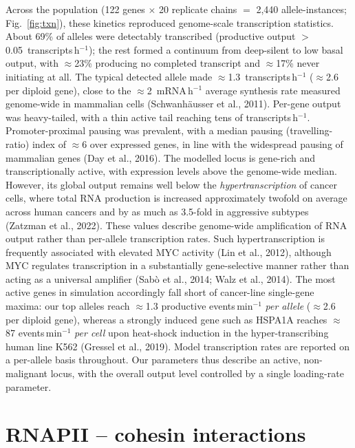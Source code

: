 \documentclass[11pt]{article}
\begin{document}
Across the population (122 genes $\times$ 20 replicate chains $=$ 2{,}440
allele-instances; Fig.~\ref{fig:txn}), these kinetics reproduced genome-scale
transcription statistics. About 69\% of alleles were detectably transcribed (productive
output $>$0.05~transcripts\,h$^{-1}$); the rest formed a continuum from deep-silent to
low basal output, with $\approx$23\% producing no completed transcript and $\approx$17\%
never initiating at all. The typical detected allele made
$\approx$1.3~transcripts\,h$^{-1}$ ($\approx$2.6 per diploid gene), close to the
$\approx$2~mRNA\,h$^{-1}$ average synthesis rate measured genome-wide in mammalian cells
(Schwanh\"ausser et al., 2011). Per-gene output was heavy-tailed, with a thin active
tail reaching tens of transcripts\,h$^{-1}$. Promoter-proximal pausing was prevalent,
with a median pausing (travelling-ratio) index of $\approx$6 over expressed genes, in
line with the widespread pausing of mammalian genes (Day et al., 2016). The modelled
locus is gene-rich and transcriptionally active, with expression levels above the
genome-wide median. However, its global output remains well below the
\emph{hypertranscription} of cancer cells, where total RNA production is increased
approximately twofold on average across human cancers and by as much as 3.5-fold in
aggressive subtypes (Zatzman et al., 2022). These values describe genome-wide
amplification of RNA output rather than per-allele transcription rates. Such
hypertranscription is frequently associated with elevated MYC activity (Lin et al.,
2012), although MYC regulates transcription in a substantially gene-selective manner
rather than acting as a universal amplifier (Sab\`o et al., 2014; Walz et al., 2014).
The most active genes in simulation accordingly fall short of cancer-line single-gene
maxima: our top alleles reach $\approx$1.3 productive events\,min$^{-1}$ \emph{per
allele} ($\approx$2.6 per diploid gene), whereas a strongly induced gene such as HSPA1A
reaches $\approx$87 events\,min$^{-1}$ \emph{per cell} upon heat-shock induction in the
hyper-transcribing human line K562 (Gressel et al., 2019). Model transcription rates
are reported on a per-allele basis throughout. Our parameters thus describe an active,
non-malignant locus, with the overall output level controlled by a single loading-rate
parameter.

\section{RNAPII -- cohesin interactions}
\end{document}
